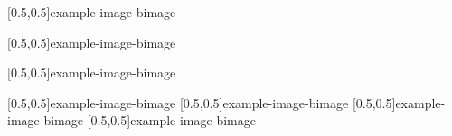



\graphicspath{{Figures/}{Figures/Iceland}}


\subtitle{Day 3}
\date{09.10.2019}


    
    
    
    [0.5,0.5]{example-image-b}{image}
    
    [0.5,0.5]{example-image-b}{image}
    
    [0.5,0.5]{example-image-b}{image}
    
    [0.5,0.5]{example-image-b}{image}
    [0.5,0.5]{example-image-b}{image}
    [0.5,0.5]{example-image-b}{image}
    [0.5,0.5]{example-image-b}{image}

